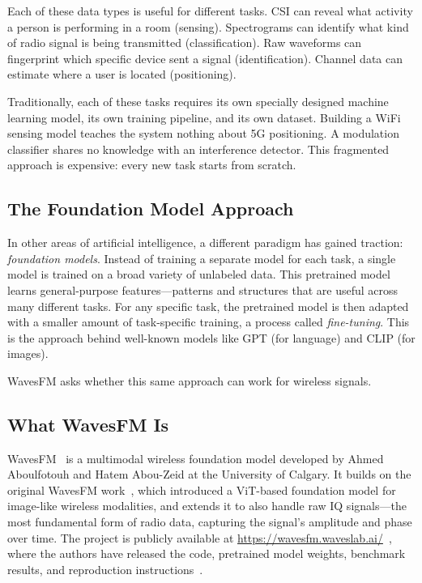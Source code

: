 \documentclass[11pt]{article}
\begin{document}
Each of these data types is useful for different tasks. CSI can reveal what activity a person is performing in a room (sensing). Spectrograms can identify what kind of radio signal is being transmitted (classification). Raw waveforms can fingerprint which specific device sent a signal (identification). Channel data can estimate where a user is located (positioning).

Traditionally, each of these tasks requires its own specially designed machine learning model, its own training pipeline, and its own dataset. Building a WiFi sensing model teaches the system nothing about 5G positioning. A modulation classifier shares no knowledge with an interference detector. This fragmented approach is expensive: every new task starts from scratch.

\subsection{The Foundation Model Approach}

In other areas of artificial intelligence, a different paradigm has gained traction: \textit{foundation models}. Instead of training a separate model for each task, a single model is trained on a broad variety of unlabeled data. This pretrained model learns general-purpose features---patterns and structures that are useful across many different tasks. For any specific task, the pretrained model is then adapted with a smaller amount of task-specific training, a process called \textit{fine-tuning}. This is the approach behind well-known models like GPT (for language) and CLIP (for images).

WavesFM asks whether this same approach can work for wireless signals.

\subsection{What WavesFM Is}

WavesFM~\cite{wavesfm_paper,wavesfm_original} is a multimodal wireless foundation model developed by Ahmed Aboulfotouh and Hatem Abou-Zeid at the University of Calgary. It builds on the original WavesFM work~\cite{wavesfm_original}, which introduced a ViT-based foundation model for image-like wireless modalities, and extends it to also handle raw IQ signals---the most fundamental form of radio data, capturing the signal's amplitude and phase over time. The project is publicly available at \url{https://wavesfm.waveslab.ai/}~\cite{wavesfm_home}, where the authors have released the code, pretrained model weights, benchmark results, and reproduction instructions~\cite{wavesfm_reproduce}.
\end{document}
